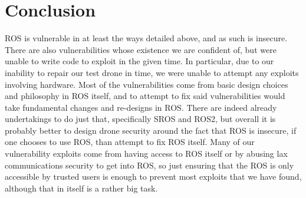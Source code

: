 \documentclass[IEEEtran,letterpaper,10pt,notitlepage,draftclsnofoot]{article}
\begin{document}
\section{Conclusion}
ROS is vulnerable in at least the ways detailed above, and as such is insecure.
There are also vulnerabilities whose existence we are confident of, but were unable to write code to exploit in the given time.
In particular, due to our inability to repair our test drone in time, we were unable to attempt any exploits involving hardware.
Most of the vulnerabilities come from basic design choices and philosophy in ROS itself, and to attempt to fix said vulnerabilities would take fundamental changes and re-designs in ROS.
There are indeed already undertakings to do just that, specifically SROS and ROS2, but overall it is probably better to design drone security around the fact that ROS is insecure, if one chooses to use ROS, than attempt to fix ROS itself.
Many of our vulnerability exploits come from having access to ROS itself or by abusing lax communications security to get into ROS, so just ensuring that the ROS is only accessible by trusted users is enough to prevent most exploits that we have found, although that in itself is a rather big task.



\end{document}
